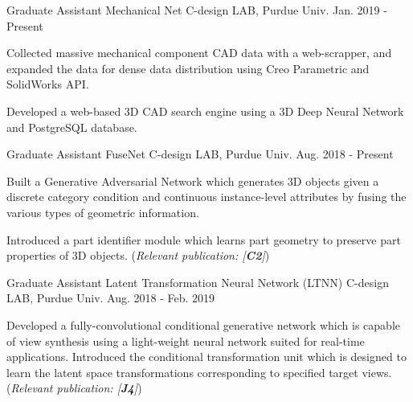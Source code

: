 


\begin{cventries}

\cventry
{Graduate Assistant} %
{Mechanical Net} %
{C-design LAB, Purdue Univ.} %
{Jan. 2019 - Present} %
{ %
\begin{cvitems}
\item {Collected massive mechanical component CAD data with a web-scrapper, and expanded the data for dense data distribution using Creo Parametric and SolidWorks API.}
\item {Developed a web-based 3D CAD search engine using a 3D Deep Neural Network and PostgreSQL database.}
\end{cvitems}
}


\cventry
{Graduate Assistant} %
{FuseNet} %
{C-design LAB, Purdue Univ.} %
{Aug. 2018 - Present} %
{ %
\begin{cvitems}
\item {Built a Generative Adversarial Network which generates 3D objects given a discrete category condition and continuous instance-level attributes by fusing the various types of geometric information.}
\item {Introduced a part identifier module which learns part geometry to preserve part properties of 3D objects. (\textit{Relevant publication: [\textbf{C2}]})}
\end{cvitems}
}


\cventry
{Graduate Assistant} %
{Latent Transformation Neural Network (LTNN)} %
{C-design LAB, Purdue Univ.} %
{Aug. 2018 - Feb. 2019} %
{ %
\begin{cvitems}
\item {Developed a fully-convolutional conditional generative network which is capable of view synthesis using a light-weight neural network suited for real-time applications. Introduced the conditional transformation unit which is designed to learn the latent space transformations corresponding to specified target views. (\textit{Relevant publication: [\textbf{J4}]})}
\end{cvitems}
}


\end{cventries}
